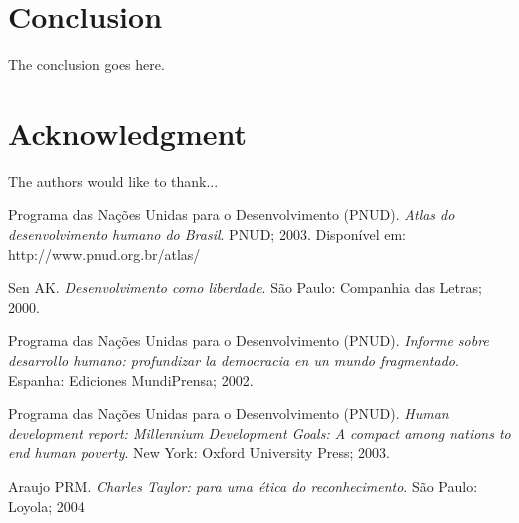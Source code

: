 \documentclass[conference]{IEEEtran}
\begin{document}
\section{Conclusion}
The conclusion goes here.






\section*{Acknowledgment}


The authors would like to thank...




\begin{thebibliography}{1}


Programa das Nações Unidas para o Desenvolvimento (PNUD). \emph{Atlas do desenvolvimento humano do Brasil}. PNUD; 2003. Disponível em: http://www.pnud.org.br/atlas/

Sen AK. \emph{Desenvolvimento como liberdade}. São Paulo: Companhia das Letras; 2000.

Programa das Nações Unidas para o Desenvolvimento (PNUD). \emph{Informe sobre desarrollo humano: profundizar la democracia en un mundo fragmentado}. Espanha: Ediciones MundiPrensa; 2002.

Programa das Nações Unidas para o Desenvolvimento (PNUD). \emph{Human development report: Millennium Development Goals: A compact among nations to end human poverty}. New York: Oxford University Press; 2003.

Araujo PRM. \emph{Charles Taylor: para uma ética do reconhecimento}. São Paulo: Loyola; 2004


\end{thebibliography}




\end{document}
